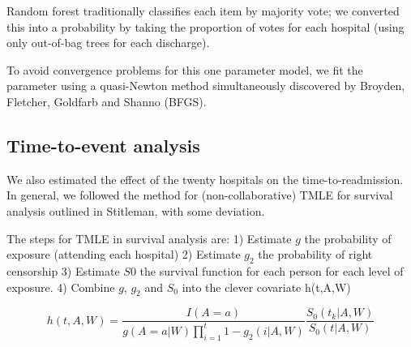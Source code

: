\documentclass[]{article}\usepackage[]{graphicx}\usepackage[]{color}
\begin{document}
Random forest traditionally classifies each item by majority vote; we converted this into a probability by taking the proportion of votes for each hospital (using only out-of-bag trees for each discharge).

To avoid convergence problems for this one parameter model, we fit the parameter using a quasi-Newton method simultaneously discovered by Broyden\supercite{broyden_convergence_1970}, Fletcher\supercite{fletcher_new_1970}, Goldfarb\supercite{goldfarb_family_1970} and Shanno\supercite{shanno_conditioning_1970} (BFGS).


\subsection{Time-to-event analysis}
We also estimated the effect of the twenty hospitals on the time-to-readmission. In general, we followed the method for (non-collaborative) TMLE for survival analysis outlined in Stitleman, with some deviation. 

The steps for TMLE in survival analysis are: 1) Estimate $g$ the probability of exposure (attending each hospital) 2) Estimate $g_2$ the probability of right censorship 3) Estimate $S0$ the survival function for each person for each level of exposure. 4) Combine $g$, $g_2$ and $S_0$ into the clever covariate h(t,A,W) 

\begin{equation}
\label{survival_clever_covariate} 
h(t,A,W)=\frac{I(A=a)}{g(A=a|W)\prod_{i=1}^t1-g_2(i|A,W)}\frac{S_0(t_k|A,W)}{S_0(t|A,W)}
\end{equation}
\end{document}

